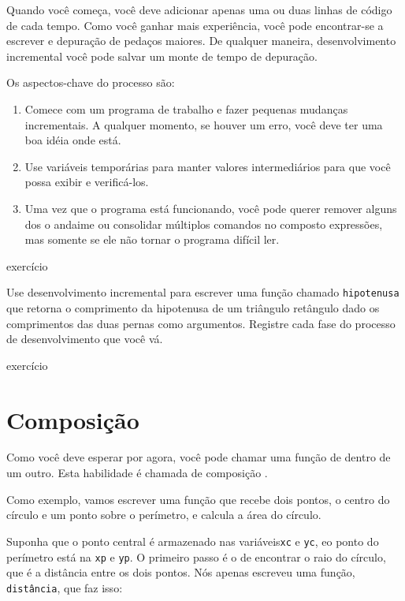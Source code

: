 \documentclass[10pt]{book}
\begin{document}
{{{Quando você começa, você deve adicionar apenas uma ou duas linhas de código de cada
tempo. Como você ganhar mais experiência, você pode encontrar-se a escrever
e depuração de pedaços maiores. De qualquer maneira, desenvolvimento incremental
você pode salvar um monte de tempo de depuração.

Os aspectos-chave do processo são:

\begin{enumerate}

\item Comece com um programa de trabalho e fazer pequenas mudanças incrementais. 
A qualquer momento, se houver um erro, você deve ter uma boa idéia
onde está.

\item Use variáveis ​​temporárias para manter valores intermediários para que você possa
exibir e verificá-los.

\item Uma vez que o programa está funcionando, você pode querer remover alguns dos
o andaime ou consolidar múltiplos comandos no composto
expressões, mas somente se ele não tornar o programa difícil
ler.

\end{enumerate}

\begin{} exercício

Use desenvolvimento incremental para escrever uma função
chamado {\tt hipotenusa} que retorna o comprimento da hipotenusa de um
triângulo retângulo dado os comprimentos das duas pernas como argumentos.
Registre cada fase do processo de desenvolvimento que você vá.
\end{} exercício


\section{Composição}

Como você deve esperar por agora, você pode chamar uma função de
dentro de um outro. Esta habilidade é chamada de composição {\bf}.

Como exemplo, vamos escrever uma função que recebe dois pontos,
o centro do círculo e um ponto sobre o perímetro, e calcula
a área do círculo.

Suponha que o ponto central é armazenado nas variáveis ​​{\tt xc} e
{\tt yc}, eo ponto do perímetro está na {\tt xp} e {\tt yp}. O
primeiro passo é o de encontrar o raio do círculo, que é a distância
entre os dois pontos. Nós apenas escreveu uma função, {\tt
distância}, que faz isso:

}}}
\end{document}
